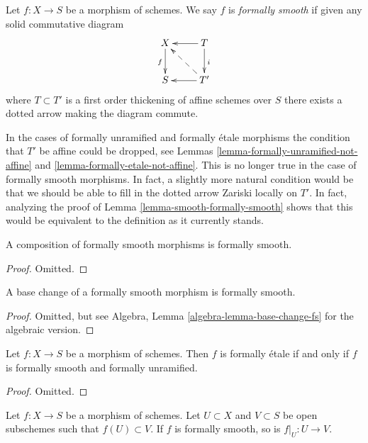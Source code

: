 \begin{definition}
\label{definition-formally-smooth}
Let $f : X \to S$ be a morphism of schemes.
We say $f$ is {\it formally smooth} if given any solid commutative diagram
$$
\xymatrix{
X \ar[d]_f & T \ar[d]^i \ar[l] \\
S & T' \ar[l] \ar@{-->}[lu]
}
$$
where $T \subset T'$ is a first order thickening of affine schemes over $S$
there exists a dotted arrow making the diagram commute.
\end{definition}

\noindent
In the cases of formally unramified and formally \'etale morphisms
the condition that $T'$ be affine could be dropped, see
Lemmas \ref{lemma-formally-unramified-not-affine} and
\ref{lemma-formally-etale-not-affine}.
This is no longer true in the case of formally smooth morphisms.
In fact, a slightly more natural condition would be that we should be
able to fill in the dotted arrow Zariski locally on $T'$. In fact, analyzing
the proof of
Lemma \ref{lemma-smooth-formally-smooth}
shows that this would be equivalent to the definition as it currently
stands.

\begin{lemma}
\label{lemma-composition-formally-smooth}
A composition of formally smooth morphisms is formally smooth.
\end{lemma}

\begin{proof}
Omitted.
\end{proof}

\begin{lemma}
\label{lemma-base-change-formally-smooth}
A base change of a formally smooth morphism is formally smooth.
\end{lemma}

\begin{proof}
Omitted, but see Algebra, Lemma \ref{algebra-lemma-base-change-fs}
for the algebraic version.
\end{proof}

\begin{lemma}
\label{lemma-formally-etale-unramified-smooth}
Let $f : X \to S$ be a morphism of schemes.
Then $f$ is formally \'etale if and only if
$f$ is formally smooth and formally unramified.
\end{lemma}

\begin{proof}
Omitted.
\end{proof}

\begin{lemma}
\label{lemma-formally-smooth-on-opens}
Let $f : X \to S$ be a morphism of schemes.
Let $U \subset X$ and $V \subset S$ be open subschemes such that
$f(U) \subset V$. If $f$ is formally smooth, so is $f|_U : U \to V$.
\end{lemma}

